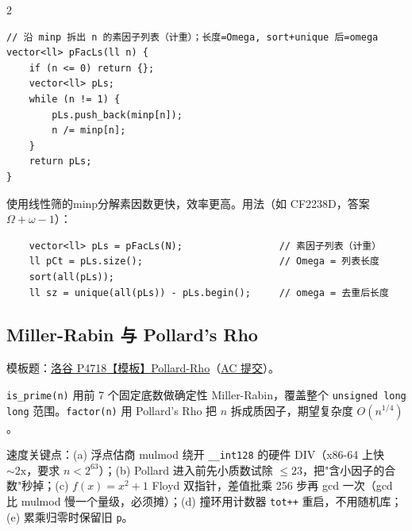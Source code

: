 \begin{multicols*}{2}
\begin{verbatim}
// 沿 minp 拆出 n 的素因子列表（计重）；长度=Omega, sort+unique 后=omega
vector<ll> pFacLs(ll n) {
	if (n <= 0) return {};
	vector<ll> pLs;
	while (n != 1) {
		pLs.push_back(minp[n]);
		n /= minp[n];
	}
	return pLs;
}
		\end{verbatim}

		使用线性筛的minp分解素因数更快，效率更高。用法（如 CF2238D，答案 $\Omega+\omega-1$）：

		\begin{verbatim}
	vector<ll> pLs = pFacLs(N);					// 素因子列表（计重）
	ll pCt = pLs.size();						// Omega = 列表长度
	sort(all(pLs));
	ll sz = unique(all(pLs)) - pLs.begin();		// omega = 去重后长度
		\end{verbatim}

		\subsection{Miller-Rabin 与 Pollard's Rho}

		模板题：\href{https://vjudge.net/problem/洛谷-P4718}{洛谷 P4718【模板】Pollard-Rho}（\href{https://vjudge.net/solution/69880751}{AC 提交}）。

		\verb|is_prime(n)| 用前 7 个固定底数做确定性 Miller-Rabin，覆盖整个 \verb|unsigned long long| 范围。\verb|factor(n)| 用 Pollard's Rho 把 $n$ 拆成质因子，期望复杂度 $O(n^{1/4})$。

		速度关键点：(a) 浮点估商 mulmod 绕开 \verb|__int128| 的硬件 DIV（x86-64 上快 $\sim 2\text{x}$，要求 $n < 2^{63}$）；(b) Pollard 进入前先小质数试除 $\le 23$，把"含小因子的合数"秒掉；(c) $f(x)=x^2+1$ Floyd 双指针，差值批乘 256 步再 gcd 一次（gcd 比 mulmod 慢一个量级，必须摊）；(d) 撞环用计数器 \verb|tot++| 重启，不用随机库；(e) 累乘归零时保留旧 \verb|p|。


\end{multicols*}
